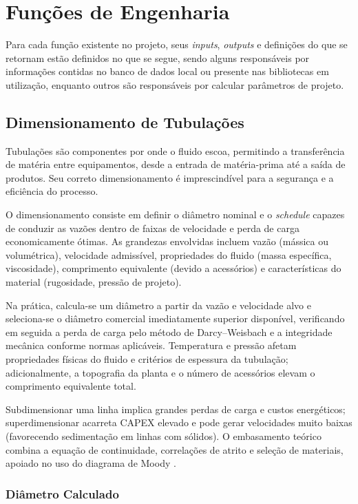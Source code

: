 \section{Funções de Engenharia}

Para cada função existente no projeto, seus \textit{inputs}, \textit{outputs} e definições do que se retornam estão definidos no que se segue, sendo alguns responsáveis por informações contidas no banco de dados local ou presente nas bibliotecas em utilização, enquanto outros são responsáveis por calcular parâmetros de projeto.

\subsection{Dimensionamento de Tubulações}

Tubulações são componentes por onde o fluido escoa, permitindo a transferência de matéria entre equipamentos, desde a entrada de matéria-prima até a saída de produtos. Seu correto dimensionamento é imprescindível para a segurança e a eficiência do processo.

O dimensionamento consiste em definir o diâmetro nominal e o \textit{schedule} capazes de conduzir as vazões dentro de faixas de velocidade e perda de carga economicamente ótimas. As grandezas envolvidas incluem vazão (mássica ou volumétrica), velocidade admissível, propriedades do fluido (massa específica, viscosidade), comprimento equivalente (devido a acessórios) e características do material (rugosidade, pressão de projeto).

Na prática, calcula-se um diâmetro a partir da vazão e velocidade alvo e seleciona-se o diâmetro comercial imediatamente superior disponível, verificando em seguida a perda de carga pelo método de Darcy–Weisbach e a integridade mecânica conforme normas aplicáveis. Temperatura e pressão afetam propriedades físicas do fluido e critérios de espessura da tubulação; adicionalmente, a topografia da planta e o número de acessórios elevam o comprimento equivalente total.

Subdimensionar uma linha implica grandes perdas de carga e custos energéticos; superdimensionar acarreta CAPEX elevado e pode gerar velocidades muito baixas (favorecendo sedimentação em linhas com sólidos). O embasamento teórico combina a equação de continuidade, correlações de atrito e seleção de materiais, apoiado no uso do diagrama de Moody \cite{white2018}.

\subsubsection{Diâmetro Calculado}

